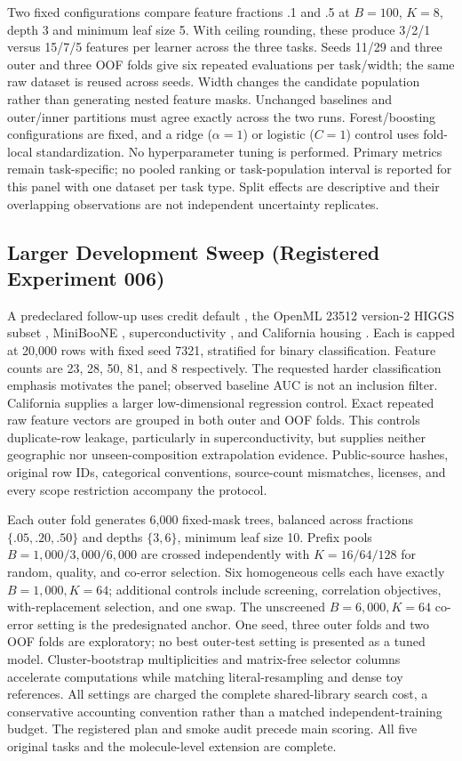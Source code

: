Two fixed configurations compare feature fractions .1 and .5 at $B=100$, $K=8$,
depth 3 and minimum leaf size 5. With ceiling rounding, these produce 3/2/1 versus
15/7/5 features per learner across the three tasks. Seeds 11/29 and three outer
and three OOF folds give six repeated evaluations per task/width; the same raw
dataset is reused across seeds. Width changes the candidate population rather
than generating nested feature masks. Unchanged baselines and outer/inner
partitions must agree exactly across the two runs. Forest/boosting configurations
are fixed, and a ridge ($\alpha=1$) or logistic ($C=1$) control uses fold-local
standardization. No hyperparameter tuning is performed. Primary metrics remain
task-specific; no pooled ranking or task-population interval is reported for
this panel with one dataset per task type. Split effects are descriptive and
their overlapping observations are not independent uncertainty replicates.

\subsection{Larger Development Sweep (Registered Experiment 006)}
A predeclared follow-up uses credit default \citep{credit2009}, the OpenML 23512
version-2 HIGGS subset \citep{higgs2014data,baldi2014}, MiniBooNE
\citep{miniboone2005}, superconductivity \citep{supercon2018}, and California
housing \citep{pace1997}. Each is capped
at 20,000 rows with fixed seed 7321, stratified for binary classification.
Feature counts are 23, 28, 50, 81, and 8 respectively. The requested harder
classification emphasis motivates the panel; observed baseline AUC is not an
inclusion filter. California supplies a larger low-dimensional regression control.
Exact repeated raw feature vectors are grouped in both outer and OOF folds.
This controls duplicate-row leakage, particularly in superconductivity, but
supplies neither geographic nor unseen-composition extrapolation evidence.
Public-source hashes, original row IDs, categorical conventions, source-count
mismatches, licenses, and every scope restriction accompany the protocol.

Each outer fold generates 6,000 fixed-mask trees, balanced across fractions
$\{.05,.20,.50\}$ and depths $\{3,6\}$, minimum leaf size 10. Prefix pools
$B=1,000/3,000/6,000$ are crossed independently with $K=16/64/128$ for random,
quality, and co-error selection. Six homogeneous cells each have exactly
$B=1,000,K=64$; additional controls include screening, correlation objectives,
with-replacement selection, and one swap. The unscreened $B=6,000,K=64$ co-error
setting is the predesignated anchor. One seed, three outer folds and two OOF
folds are exploratory; no best outer-test setting is presented as a tuned model.
Cluster-bootstrap multiplicities and matrix-free selector columns accelerate
computations while matching literal-resampling and dense toy references.
All settings are charged the complete shared-library search cost, a conservative
accounting convention rather than a matched independent-training budget.
The registered plan and smoke audit precede main scoring. All five original tasks
and the molecule-level extension are complete.

